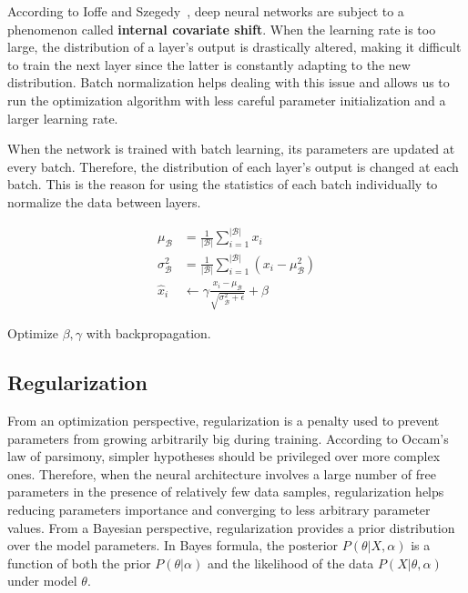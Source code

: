         According to Ioffe and Szegedy~\cite{DBLP:journals/corr/IoffeS15}, deep neural networks are subject to a phenomenon
        called \textbf{internal covariate shift}. When the learning rate is too large, the distribution of a layer's output
        is drastically altered, making it difficult to train the next layer since the latter is constantly adapting to the new
        distribution. Batch normalization helps dealing with this issue and allows us to run the optimization algorithm with less
        careful parameter initialization and a larger learning rate.

        When the network is trained with batch learning, its parameters are updated at every batch. Therefore, the distribution
        of each layer's output is changed at each batch. This is the reason for using the statistics of each batch individually
        to normalize the data between layers.


        \begin{equation}
            \begin{split}
                \mu_{\mathcal{B}} & = \frac{1}{\vert\mathcal{B}\vert} \sum\limits_{i=1}^{\vert\mathcal{B}\vert} x_i \\
                \sigma_{\mathcal{B}}^2 & = \frac{1}{\vert\mathcal{B}\vert} \sum\limits_{i=1}^{\vert\mathcal{B}\vert} (x_i - \mu_{\mathcal{B}}^2) \\
                \hat{x}_i & \leftarrow \gamma \frac{x_i - \mu_{\mathcal{B}}}{\sqrt{\sigma_{\mathcal{B}}^2 + \epsilon}} + \beta
            \end{split}
        \end{equation}

        Optimize $\beta, \gamma$ with backpropagation. \todo{}

    \subsection{Regularization}

    	From an optimization perspective, regularization is a penalty used to prevent
    	parameters from growing arbitrarily big during training.
    	According to Occam's law of parsimony, simpler hypotheses should be privileged over more complex ones.
    	Therefore, when the neural architecture involves a large number of free parameters
    	in the presence of relatively few data samples,
    	regularization helps reducing parameters importance and converging to less arbitrary parameter values.
    	From a Bayesian perspective, regularization provides a prior distribution over the model parameters.
    	In Bayes formula, the posterior $P(\theta \vert X, \alpha)$ is a function of both the prior
    	$P(\theta \vert \alpha)$ and the likelihood of the data $P(X \vert \theta, \alpha)$ under model $\theta$.

